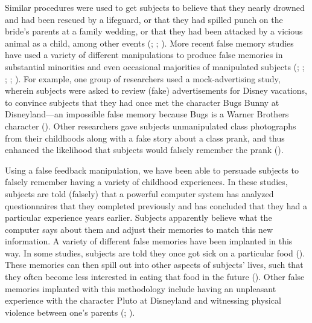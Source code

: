 \documentclass[
]{krantz}
\begin{document}
Similar procedures were used to get subjects to believe that they nearly drowned and had been rescued by a lifeguard, or that they had spilled punch on the bride's parents at a family wedding, or that they had been attacked by a vicious animal as a child, among other events (; ; ). More recent false memory studies have used a variety of different manipulations to produce false memories in substantial minorities and even occasional majorities of manipulated subjects (; ; ; ; ). For example, one group of researchers used a mock-advertising study, wherein subjects were asked to review (fake) advertisements for Disney vacations, to convince subjects that they had once met the character Bugs Bunny at Disneyland---an impossible false memory because Bugs is a Warner Brothers character (). Other researchers gave subjects unmanipulated class photographs from their childhoods along with a fake story about a class prank, and thus enhanced the likelihood that subjects would falsely remember the prank ().

Using a false feedback manipulation, we have been able to persuade subjects to falsely remember having a variety of childhood experiences. In these studies, subjects are told (falsely) that a powerful computer system has analyzed questionnaires that they completed previously and has concluded that they had a particular experience years earlier. Subjects apparently believe what the computer says about them and adjust their memories to match this new information. A variety of different false memories have been implanted in this way. In some studies, subjects are told they once got sick on a particular food (). These memories can then spill out into other aspects of subjects' lives, such that they often become less interested in eating that food in the future (). Other false memories implanted with this methodology include having an unpleasant experience with the character Pluto at Disneyland and witnessing physical violence between one's parents (; ).
\end{document}
